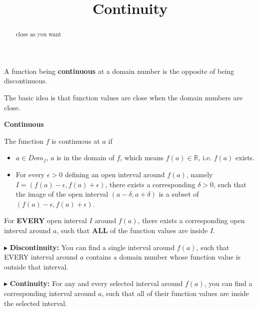 \documentclass{ximera}
\title{Continuity}
\begin{document}
\begin{abstract}
close as you want
\end{abstract}
\maketitle






A function being \textbf{continuous} at a domain number is the opposite of being discontinuous. 


The basic idea is that function values are close when the domain numbers are close.









\begin{definition} \textbf{\textcolor{green!50!black}{Continuous}}

The function $f$ is continuous at $a$ if


\begin{itemize}
\item $a \in Dom_f$, $a$ is in the domain of $f$, which means $f(a) \in \mathbb{R}$, i.e. $f(a)$ exists.
\item For every $\epsilon > 0$ defining an open interval around $f(a)$, namely $I = (f(a) - \epsilon, f(a) + \epsilon)$, there exists a corresponding $\delta > 0$, such that the image of the open interval $(a - \delta, a + \delta)$ is a subset of $(f(a)-\epsilon, f(a)+\epsilon)$.
\end{itemize}


For \textbf{\textcolor{red!70!black}{EVERY}} open interval $I$ around $f(a)$, there exists a corresponding open interval around $a$, such that \textbf{\textcolor{red!70!black}{ALL}} of the function values are inside $I$.


\end{definition}





$\blacktriangleright$ \textbf{Discontinuity:}  You can find a single interval around $f(a)$, such that EVERY interval around $a$ contains a domain number whose function value is outside that interval.


$\blacktriangleright$ \textbf{Continuity:} For any and every selected interval around $f(a)$, you can find a corresponding interval around $a$, such that all of their function values are inside the selected interval.
\end{document}
